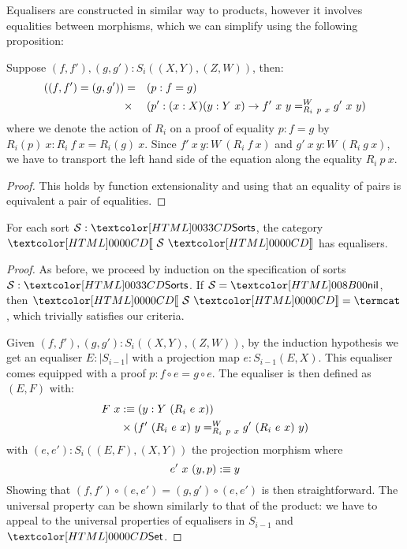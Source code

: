 Equalisers are constructed in similar way to products, however it
involves equalities between morphisms, which we can simplify using the
following proposition:

\begin{proposition}
  Suppose $(f,f'), (g,g') : S_i((X,Y),(Z,W))$, then:
  \begin{align*}
    ((f,f') = (g,g')) &=& &(p : f = g) \\
                      &\times& &(p' : (x : X) (y : Y\ x) \to \pathover{W}{R_i\ p\ x}{f'\ x\ y}{g'\ x\ y})
  \end{align*}
  where we denote the action of $R_i$ on a proof of equality
  $p : f = g$ by $R_i(p)\ x : R_i\ f\ x = R_i(g)\ x$. Since
  $f'\ x\ y : W\ (R_i\ f\ x)$ and $g'\ x\ y : W\ (R_i\ g\ x)$, we have
  to transport the left hand side of the equation along the equality
  $R_i\ p\ x$.
\end{proposition}

\begin{proof}
  This holds by function extensionality and using that an equality of
  pairs is equivalent a pair of equalities.
\end{proof}
\begin{lemma}
\label{sorts-equalisers}
  For each sort $\Ss : \sortsty$, the category $\SortCat{\Ss}$ has
  equalisers.
\end{lemma}

\begin{proof}
  As before, we proceed by induction on the specification of sorts
  $\Ss : \sortsty$.  If $\Ss = \sortsnil$, then $\SortCat{\Ss} = \termcat$,
  which trivially satisfies our criteria.



  Given $(f,f'), (g,g') : S_i((X,Y),(Z,W))$, by the induction
  hypothesis we get an equaliser $E : |S_{i-1}|$ with a projection map
  $e : S_{i-1}(E,X)$. This equaliser comes equipped with a proof
  $p : f \circ e = g \circ e$. The equaliser is then defined as
  $(E,F)$ with:
  \begin{align*}
    F\ x & \ddefeq (y : Y\ (R_i\ e\ x)) \\
         & \times (\pathover{W}{R_i\ p\ x}{f'\ (R_i\ e\ x)\ y}{g'\ (R_i\ e\ x)\ y})
  \end{align*}
  with $(e,e') : S_i((E,F),(X,Y))$ the projection morphism where
  \[
    e'\ x\ (y , p) \ddefeq y
  \]
  Showing that $(f,f') \circ (e,e') = (g,g') \circ (e,e')$ is then
  straightforward. The universal property can be shown similarly to
  that of the product: we have to appeal to the universal properties
  of equalisers in $S_{i-1}$ and $\Set$.
\end{proof}

